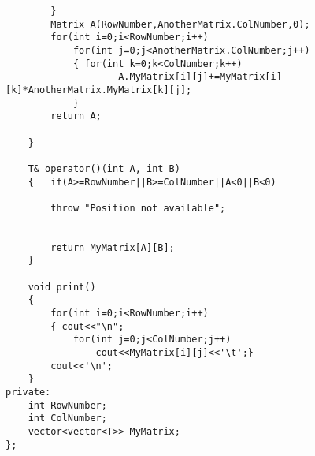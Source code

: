 \documentclass[12pt]{article}
\begin{document}
\begin{lstlisting}
        }
        Matrix A(RowNumber,AnotherMatrix.ColNumber,0);
        for(int i=0;i<RowNumber;i++)
            for(int j=0;j<AnotherMatrix.ColNumber;j++)
            { for(int k=0;k<ColNumber;k++)
                    A.MyMatrix[i][j]+=MyMatrix[i][k]*AnotherMatrix.MyMatrix[k][j];
            }
        return A;
        
    }
    
    T& operator()(int A, int B)
    {   if(A>=RowNumber||B>=ColNumber||A<0||B<0)
    
        throw "Position not available";
        
    
        return MyMatrix[A][B];
    }
    
    void print()
    {
        for(int i=0;i<RowNumber;i++)
        { cout<<"\n";
            for(int j=0;j<ColNumber;j++)
                cout<<MyMatrix[i][j]<<'\t';}
        cout<<'\n';
    }
private:
    int RowNumber;
    int ColNumber;
    vector<vector<T>> MyMatrix;
};


\end{lstlisting}
\end{document}
